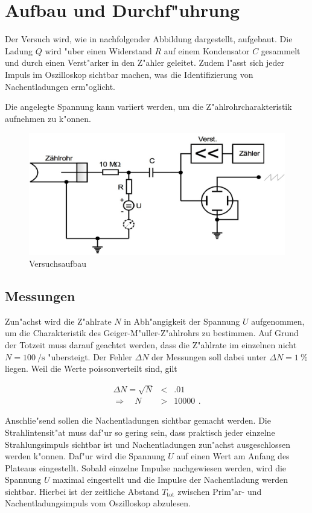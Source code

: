 \section{Aufbau und Durchf"uhrung}
\label{sec:durchfuehrung}
	Der Versuch wird, wie in nachfolgender Abbildung dargestellt, aufgebaut.
	Die Ladung $Q$ wird "uber einen Widerstand $R$ auf einem Kondensator $C$ gesammelt und durch einen Verst"arker in den Z"ahler geleitet.
	Zudem l"asst sich jeder Impuls im Oszilloskop sichtbar machen, was die Identifizierung von Nachentladungen erm"oglicht.

	Die angelegte Spannung kann variiert werden, um die Z"ahlrohrcharakteristik aufnehmen zu k"onnen.

	\begin{figure}[h]
		\centering
		\includegraphics[width = 15cm]{img/aufbau.jpeg}
		\caption{Versuchsaufbau \cite{anleitung}}
		\label{fig:aufbau}
	\end{figure}

	\subsection{Messungen}
	\label{subsec:messungen}
		Zun"achst wird die Z"ahlrate $N$ in Abh"angigkeit der Spannung $U$ aufgenommen, um die Charakteristik des Geiger-M"uller-Z"ahlrohrs zu bestimmen.
		Auf Grund der Totzeit muss darauf geachtet werden, dass die Z"ahlrate im einzelnen nicht $N = \SI{100}{\per \second}$ "ubersteigt.
		Der Fehler $\Delta N$ der Messungen soll dabei unter $\Delta N = \SI{1}{\percent}$ liegen.
		Weil die Werte poissonverteilt sind, gilt

		\begin{eqnarray*}
			\Delta N = \sqrt{N} & < & \SI{.01}{} \\
			\Rightarrow \quad N & > & \SI{10000}{} \, .
		\end{eqnarray*}

		Anschlie"send sollen die Nachentladungen sichtbar gemacht werden.
		Die Strahlintensit"at muss daf"ur so gering sein, dass praktisch jeder einzelne Strahlungsimpuls sichtbar ist und Nachentladungen zun"achst ausgeschlossen werden k"onnen.
		Daf"ur wird die Spannung $U$ auf einen Wert am Anfang des Plateaus eingestellt.
		Sobald einzelne Impulse nachgewiesen werden, wird die Spannung $U$ maximal eingestellt und die Impulse der Nachentladung werden sichtbar.
		Hierbei ist der zeitliche Abstand $T_\mathrm{tot}$ zwischen Prim"ar- und Nachentladungsimpuls vom Oszilloskop abzulesen.


